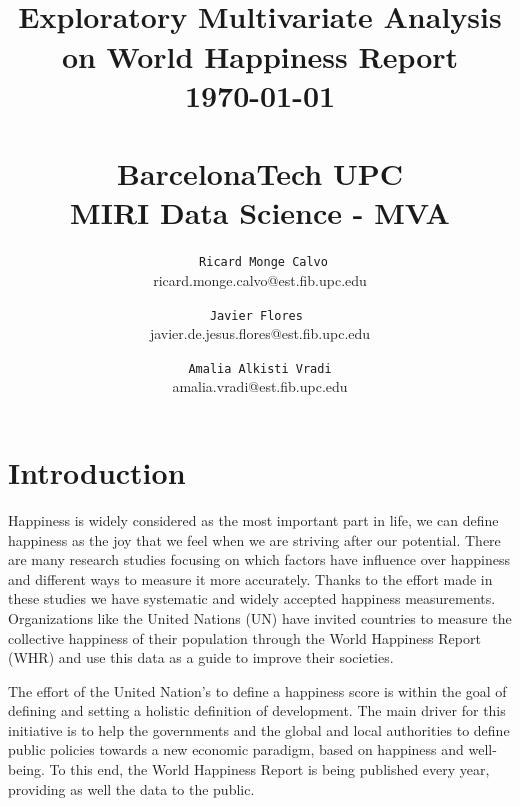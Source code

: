 \documentclass[12pt]{extarticle}
\begin{document}
{\selectfont
\title{ \normalsize \textsc{}
		\\ [2.0cm]
		\LARGE \textbf{{Exploratory Multivariate Analysis on World Happiness Report}\\
		\vspace*{2\baselineskip}
		\normalsize \today\\
		\\
		\normalsize BarcelonaTech UPC\\
		\normalsize MIRI Data Science - MVA\\
		\vspace*{15\baselineskip}
		}
}

\date{}

\author{\
\texttt{Ricard Monge Calvo}\\
ricard.monge.calvo@est.fib.upc.edu
\and
\texttt{Javier Flores }\\
javier.de.jesus.flores@est.fib.upc.edu
\and
\texttt{Amalia Alkisti Vradi}\\
amalia.vradi@est.fib.upc.edu
\and
}

}

\maketitle
\thispagestyle{empty}
\newpage

\tableofcontents

\newpage

\section{Introduction}
Happiness is widely considered as the most important part in life, we can define happiness as the joy that we feel when we are striving after our potential.  There are many research studies focusing on which factors have influence over happiness and different ways to measure it more accurately. Thanks to the effort made in these studies we have systematic and widely accepted happiness measurements. Organizations like the United Nations (UN) have invited countries to measure the collective happiness of their population through the World Happiness Report  (WHR) and use this data as a guide to improve their societies.

The effort of the United Nation’s to define a happiness score is within the goal of defining and setting a holistic definition of development. The main driver for this initiative is to help the governments and the global and local authorities to define public policies towards a new economic paradigm, based on happiness and well-being. To this end, the World Happiness Report is being published every year, providing as well the data to the public.
\end{document}
